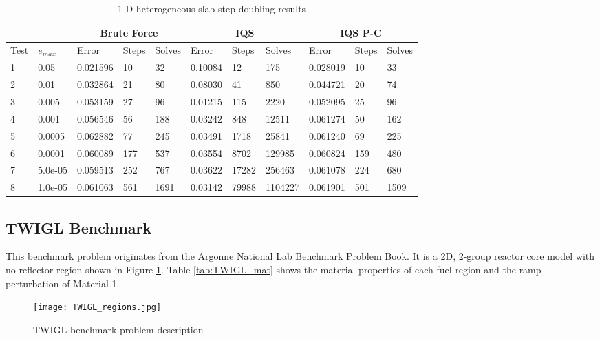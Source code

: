 \documentclass[10pt]{scrartcl}
\begin{document}
\begin{table}[!htbp]
\begin{center}
\caption{1-D heterogeneous slab step doubling results}
\label{tab:1Ddt2}
\begin{tabular}{|l|l|l|l|l|l|l|l|l|l|l|}
\hline
  &  & \multicolumn{3}{|c|}{Brute Force} & \multicolumn{3}{|c|}{IQS} & \multicolumn{3}{|c|}{IQS P-C} \\
\hline
Test & $e_{max}$ & Error & Steps & Solves & Error & Steps & Solves & Error & Steps & Solves \\
\hline
1 &	0.05 	&	0.021596 &	10  &	32	 &	0.10084 &	12	  &	175		&	0.028019 &	10	&	33 \\
2 &	0.01 	&	0.032864 &	21  &	80	 &	0.08030 &	41	  &	850	 	&	0.044721 &	20	&	74 \\
3 &	0.005 	&	0.053159 &	27  &	96	 &	0.01215 &	115	  &	2220 	&	0.052095 &	25	&	96 \\
4 & 0.001 	&	0.056546 &	56  &	188	 &	0.03242 &	848	  &	12511 	&	0.061274 &	50	&	162 \\
5 &	0.0005 	&	0.062882 &	77  &	245	 &	0.03491 &	1718  &	25841 	&	0.061240 &	69	&	225 \\
6 &	0.0001 	&	0.060089 &	177 &	537	 &	0.03554 &	8702  &	129985 	&	0.060824 &	159	&	480 \\
7 &	5.0e-05	&	0.059513 &	252 &	767	 &	0.03622 &	17282 &	256463 	&	0.061078 &	224	&	680 \\
8 &	1.0e-05	&	0.061063 &	561 &	1691 &	0.03142 &	79988 &	1104227 &	0.061901 &	501	&	1509 \\
\hline
\end{tabular}
\end{center}
\end{table}

\subsection{TWIGL Benchmark}

This benchmark problem originates from the Argonne National Lab Benchmark Problem Book.  It is a 2D, 2-group reactor core model with no reflector region shown in Figure \ref{fig:TWIGL_reg}.  Table \ref{tab:TWIGL_mat} shows the material properties of each fuel region and the ramp perturbation of Material 1.

\begin{figure}[!htbp]
\begin{center}
\texttt{[image: TWIGL\_regions.jpg]}
\caption{TWIGL benchmark problem description}
\label{fig:TWIGL_reg}
\end{center}
\end{figure}
\end{document}
